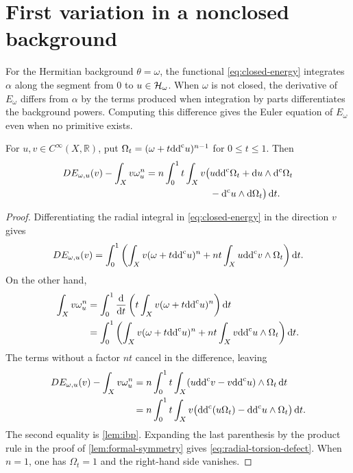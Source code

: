 \section{First variation in a nonclosed background}

For the Hermitian background $\theta=\omega$, the functional \eqref{eq:closed-energy} integrates $\alpha$ along the segment from $0$ to $u\in\mathcal H_\omega$. When $\omega$ is not closed, the derivative of $E_\omega$ differs from $\alpha$ by the terms produced when integration by parts differentiates the background powers. Computing this difference gives the Euler equation of $E_\omega$ even when no primitive exists.

\begin{proposition}\label{prop:radial-torsion-defect}
For $u,v\in C^\infty(X,\mathbb R)$, put $\Omega_t=(\omega+t\mathrm{dd}^{\mathrm{c}} u)^{n-1}$ for $0\leq t\leq1$. Then
\begin{equation}\label{eq:radial-torsion-defect}
 \begin{split}
 DE_{\omega,u}(v)-\int_Xv\omega_u^n
 =n\int_0^1t\int_Xv\bigl(&u\mathrm{dd}^{\mathrm{c}}\Omega_t
              +\mathrm{d}u\wedge\mathrm d^{\mathrm c}\Omega_t\\
              &-\mathrm d^{\mathrm c} u\wedge\mathrm{d}\Omega_t\bigr)\,\mathrm{d}t.
 \end{split}
\end{equation}
\end{proposition}
\begin{proof}
Differentiating the radial integral in \eqref{eq:closed-energy} in the direction $v$ gives
\[
 DE_{\omega,u}(v)
 =\int_0^1\left(\int_Xv(\omega+t\mathrm{dd}^{\mathrm{c}} u)^n
   +nt\int_Xu\mathrm{dd}^{\mathrm{c}} v\wedge\Omega_t\right)\mathrm dt.
\]
On the other hand,
\[
 \begin{aligned}
 \int_Xv\omega_u^n
 &=\int_0^1\frac{\mathrm d}{\mathrm dt}
       \left(t\int_Xv(\omega+t\mathrm{dd}^{\mathrm{c}} u)^n\right)\mathrm dt\\
 &=\int_0^1\left(\int_Xv(\omega+t\mathrm{dd}^{\mathrm{c}} u)^n
   +nt\int_Xv\mathrm{dd}^{\mathrm{c}} u\wedge\Omega_t\right)\mathrm dt.
 \end{aligned}
\]
The terms without a factor $nt$ cancel in the difference, leaving
\[
 \begin{aligned}
 DE_{\omega,u}(v)-\int_Xv\omega_u^n
 &=n\int_0^1t\int_X
      (u\mathrm{dd}^{\mathrm{c}} v-v\mathrm{dd}^{\mathrm{c}} u)\wedge\Omega_t\,\mathrm dt\\
 &=n\int_0^1t\int_Xv
      \bigl(\mathrm{dd}^{\mathrm{c}}(u\Omega_t)-\mathrm{dd}^{\mathrm{c}} u\wedge\Omega_t\bigr)\,\mathrm dt.
 \end{aligned}
\]
The second equality is \cref{lem:ibp}. Expanding the last parenthesis by the product rule in the proof of \cref{lem:formal-symmetry} gives \eqref{eq:radial-torsion-defect}. When $n=1$, one has $\Omega_t=1$ and the right-hand side vanishes.
\end{proof}

